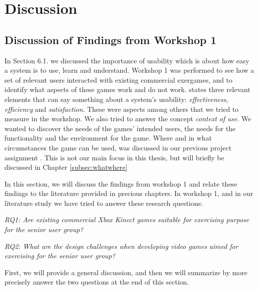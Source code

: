 \chapter{Discussion}
\label{chap:discussion}

\section{Discussion of Findings from Workshop 1}

In Section 6.1. we discussed the importance of usability which is about how easy a system is to use, learn and understand. Workshop 1 was performed to see how a set of relevant users interacted with existing commercial exergames, and to identify what aspects of these games work and do not work. \cite{usabilitydef} states three relevant elements that can say something about a system's usability: \emph{effectiveness}, \emph{efficiency}  and \emph{satisfaction}. These were aspects among others that we tried to measure in the workshop. We also tried to answer the concept \emph{context of use}. We wanted to discover the needs of the games' intended users, the needs for the functionality and the environment for the game. Where and in what circumstances the game can be used, was discussed in our previous project assignment \cite{project}. This is not our main focus in this thesis, but will briefly be discussed in Chapter \ref{subsec:whatwhere} 

In this section, we will discuss the findings from workshop 1 and relate these findings to the literature provided in precious chapters. In workshop 1, and in our literature study we have tried to answer these research questions: 

\emph{RQ1: Are existing commercial Xbox Kinect games suitable for exercising purpose for the senior user group?}

\emph{RQ2: What are the design challenges when developing video games aimed for exercising for the senior user group?}

First, we will provide a general discussion, and then we will summarize by more precisely answer the two questions at the end of this section. 

